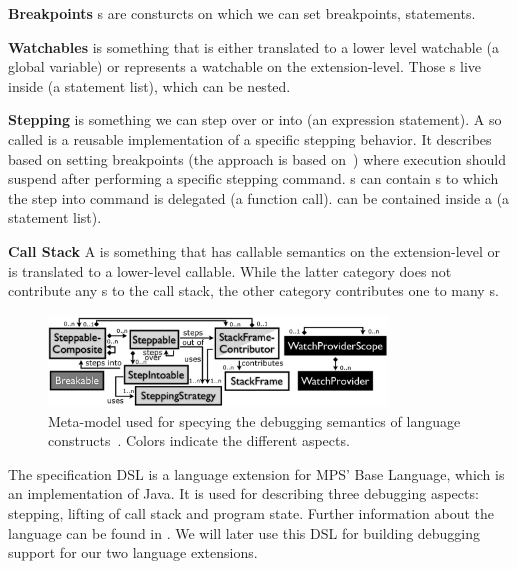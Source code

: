 \noindent \textbf{Breakpoints} s are consturcts on which we can
set breakpoints, \eg statements.

\noindent \textbf{Watchables}  is something that is either
translated to a lower level watchable (\eg a global variable) or represents a watchable on the
extension-level.
Those s live inside  (\eg a
statement list), which can be nested. 

\noindent \textbf{Stepping}  is something we can step
over or into (\eg an expression statement). A so called  is
a reusable implementation of a specific stepping behavior. It describes based on
setting breakpoints (the approach is based on~\cite{}) where execution should
suspend after performing a specific stepping command.
s can contain s
to which the step into command is delegated (\eg a function call).
 can be contained inside a  (\eg a
statement list).

\noindent \textbf{Call Stack} A  is
something that has callable semantics on the extension-level or is
translated to a lower-level callable. While the latter category does not
contribute any s to the call stack, the other category
contributes one to many s.






\begin{figure}[h]
  \vspace{-2mm}
  \centering
    \includegraphics[width=9cm]{./figures/debugger-concepts.png} 
    \vspace{-2mm}
    \caption{Meta-model used for specying the debugging semantics of language
    constructs~\cite{DBLP:conf/adaEurope/AdaEuropeDeb}. Colors indicate the
    different aspects.} 
  \label{specabs}
  \vspace{-2mm}
\end{figure}

The specification \ac{DSL} is a language extension for MPS' Base Language,
which is an implementation of Java. It is used for describing three
debugging aspects: stepping, lifting of call stack and program state. Further
information about the language can be found in
\cite{DBLP:conf/adaEurope/AdaEuropeDeb}. We will later use this \ac{DSL} for
building debugging support for our two language extensions. 



